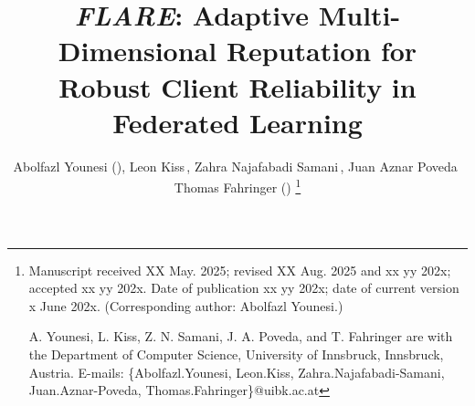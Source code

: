 \documentclass[lettersize,journal]{IEEEtran}
\begin{document}

\title{\textit{FLARE}: Adaptive Multi-Dimensional Reputation for Robust Client Reliability in Federated Learning}

\author{Abolfazl Younesi\,\,(),
Leon Kiss\,,
Zahra Najafabadi Samani\,,
Juan Aznar Poveda\,\,
Thomas Fahringer\,\,()
\thanks{Manuscript received XX May. 2025; revised XX Aug. 2025 and xx yy 202x; accepted xx yy 202x. Date of publication xx yy 202x; date of current version x June 202x. (Corresponding author: Abolfazl Younesi.)

A. Younesi, L. Kiss, Z. N. Samani, J. A. Poveda, and T. Fahringer are with the Department of Computer Science, University of Innsbruck, Innsbruck, Austria. E-mails: \{Abolfazl.Younesi, Leon.Kiss, Zahra.Najafabadi-Samani, Juan.Aznar-Poveda, Thomas.Fahringer\}@uibk.ac.at
}}


\maketitle
\end{document}
